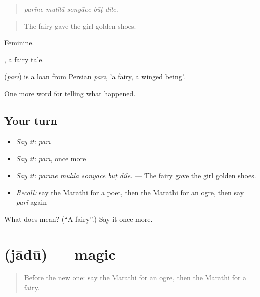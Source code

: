 \begin{quote}
\emph{parīne mulīlā sonyāce būṭ dile.}
\end{quote}

\begin{quote}
The fairy gave the girl golden shoes.
\end{quote}

Feminine.

, a fairy tale.

\begin{cousinweb}
\textbf{} (\emph{parī}) is a loan from Persian \emph{parī}, 'a fairy, a winged being'.
\end{cousinweb}

\begin{grammarlens}[title={What you've built}]
One more word for telling what happened.
\end{grammarlens}

\subsection*{Your turn}
\begin{itemize}
\raggedright
  \item \emph{Say it:} \emph{parī}
  \item \emph{Say it:} \emph{parī}, once more
  \item \emph{Say it:} \emph{parīne mulīlā sonyāce būṭ dile.} — The fairy gave the girl golden shoes.
  \item \emph{Recall:} say the Marathi for a poet, then the Marathi for an ogre, then say \emph{parī} again
\end{itemize}

\begin{tcolorbox}[breakable,colback=teal!4,colframe=teal!35!black,title={Before you move on}]
What does  mean? (\textquotedblleft{}A fairy\textquotedblright{}.) Say it once more.
\end{tcolorbox}
\section[\texorpdfstring{\mr{जादू} (jādū)}{जादू (jādū)}]{ (jādū) — magic}

\label{lesson:MR-C338-jadu}



\begin{quote}
Before the new one: say the Marathi for an ogre, then the Marathi for a fairy.
\end{quote}

